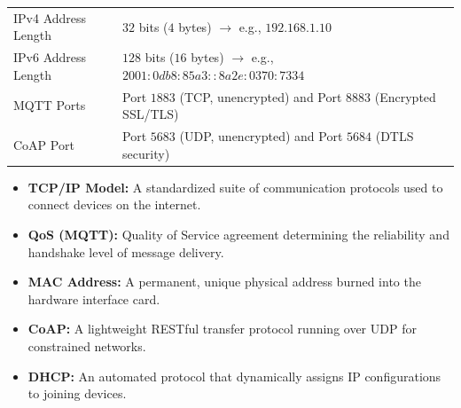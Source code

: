 \documentclass[12pt,a4paper]{article}
\renewcommand{\arraystretch}{1.45}
\begin{document}
\begin{tcolorbox}[formulabox, title={\textbf{Key Protocols and Specs at a Glance}}]
\renewcommand{\arraystretch}{1.35}
\begin{tabularx}{\linewidth}{B{5.0cm} X}
  IPv4 Address Length & $32$ bits ($4$ bytes) $\rightarrow$ e.g., $192.168.1.10$ \\[4pt]
  IPv6 Address Length & $128$ bits ($16$ bytes) $\rightarrow$ e.g., $2001:0db8:85a3::8a2e:0370:7334$ \\[4pt]
  MQTT Ports & Port $1883$ (TCP, unencrypted) and Port $8883$ (Encrypted SSL/TLS) \\[4pt]
  CoAP Port & Port $5683$ (UDP, unencrypted) and Port $5684$ (DTLS security)
\end{tabularx}
\end{tcolorbox}

\vspace{6pt}

\begin{tcolorbox}[defbox, title={\textbf{One-Line Definitions}}]
\begin{itemize}[leftmargin=*, itemsep=3pt, topsep=0pt]
  \item \textbf{TCP/IP Model:} A standardized suite of communication protocols used to connect devices on the internet.
  \item \textbf{QoS (MQTT):} Quality of Service agreement determining the reliability and handshake level of message delivery.
  \item \textbf{MAC Address:} A permanent, unique physical address burned into the hardware interface card.
  \item \textbf{CoAP:} A lightweight RESTful transfer protocol running over UDP for constrained networks.
  \item \textbf{DHCP:} An automated protocol that dynamically assigns IP configurations to joining devices.
\end{itemize}
\end{tcolorbox}

\vspace{6pt}
\end{document}
